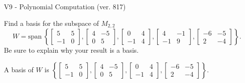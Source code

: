 \begin{exercise}
  \begin{exerciseTitle}V9 - Polynomial Computation (ver. 817)\end{exerciseTitle}
  \begin{exerciseStatement}
    Find a basis for the subspace of \(M_{2,2}\) 
\[W=\mathrm{span}\ \left\{\left[\begin{array}{cc}
5 & 5 \\
-1 & 0
\end{array}\right] , \left[\begin{array}{cc}
4 & -5 \\
0 & 5
\end{array}\right] , \left[\begin{array}{cc}
0 & 4 \\
-1 & 4
\end{array}\right] , \left[\begin{array}{cc}
4 & -1 \\
-1 & 9
\end{array}\right] , \left[\begin{array}{cc}
-6 & -5 \\
2 & -4
\end{array}\right]\right\}.\]
 Be sure to explain why your result is a basis.


  \end{exerciseStatement}
  \begin{exerciseAnswer}
   A basis of \(W\) is  \(\left\{\left[\begin{array}{cc}
5 & 5 \\
-1 & 0
\end{array}\right] , \left[\begin{array}{cc}
4 & -5 \\
0 & 5
\end{array}\right] , \left[\begin{array}{cc}
0 & 4 \\
-1 & 4
\end{array}\right] , \left[\begin{array}{cc}
-6 & -5 \\
2 & -4
\end{array}\right]\right\}\).
  


  \end{exerciseAnswer}
\end{exercise}